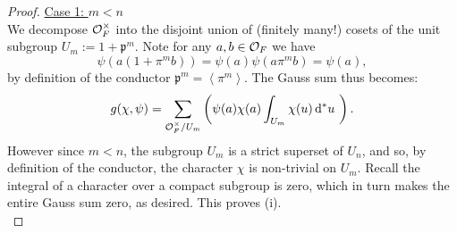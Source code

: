 \documentclass[11pt, x11names]{book}
\newcommand{\pp}{\mathfrak{p}}
\newcommand{\brangle}[1]{\left\langle #1 \right\rangle}
\renewcommand{\brack}[1]{\left(   #1 \right)}
\renewcommand{\d}[1]{\, \mathrm{d}#1 \ }
\begin{document}
\begin{proof}
\underline{Case 1: $m < n$}\\
We decompose $\mathcal{O}_F^\times$ into the disjoint union of (finitely many!) cosets of the unit subgroup $U_m := 1 + \pp^m$. Note for any $a, b \in \mathcal{O}_F$ we have
\begin{equation*}
    \psi(a(1 + \pi^m b)) = \psi(a) \psi(a\pi^m b) = \psi(a),
\end{equation*}
by definition of the conductor $\pp^m = \brangle{\pi^m}$. The Gauss sum thus becomes:
\begin{equation*}
    g(\chi, \psi) = \sum_{\calo_F^\times/U_m} \brack{\psi(a) \chi(a) \int_{U_m} \chi(u) \d{^*u}}.
\end{equation*}
However since $m < n$, the subgroup $U_m$ is a strict superset of $U_n$, and so, by definition of the conductor, the character $\chi$ is non-trivial on $U_m$. Recall the integral of a character over a compact subgroup is zero, which in turn makes the entire Gauss sum zero, as desired. This proves (i).\\


\end{proof}
\end{document}
